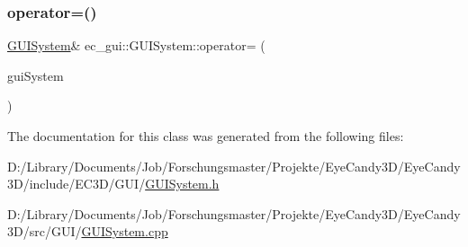 \mbox{\label{classec__gui_1_1_g_u_i_system_aa9534e934526527c532b78f4c5a60f0c}} 
\subsubsection{\texorpdfstring{operator=()}{operator=()}\hspace{0.1cm}{\footnotesize\ttfamily [2/2]}}
{\footnotesize\ttfamily \mbox{\hyperlink{classec__gui_1_1_g_u_i_system}{G\+U\+I\+System}}\& ec\+\_\+gui\+::\+G\+U\+I\+System\+::operator= (\begin{DoxyParamCaption}\item[{\mbox{\hyperlink{classec__gui_1_1_g_u_i_system}{G\+U\+I\+System}} \&\&}]{gui\+System }\end{DoxyParamCaption})\hspace{0.3cm}{\ttfamily [default]}}



The documentation for this class was generated from the following files\+:\begin{DoxyCompactItemize}
\item 
D\+:/\+Library/\+Documents/\+Job/\+Forschungsmaster/\+Projekte/\+Eye\+Candy3\+D/\+Eye\+Candy3\+D/include/\+E\+C3\+D/\+G\+U\+I/\mbox{\hyperlink{_g_u_i_system_8h}{G\+U\+I\+System.\+h}}\item 
D\+:/\+Library/\+Documents/\+Job/\+Forschungsmaster/\+Projekte/\+Eye\+Candy3\+D/\+Eye\+Candy3\+D/src/\+G\+U\+I/\mbox{\hyperlink{_g_u_i_system_8cpp}{G\+U\+I\+System.\+cpp}}\end{DoxyCompactItemize}
